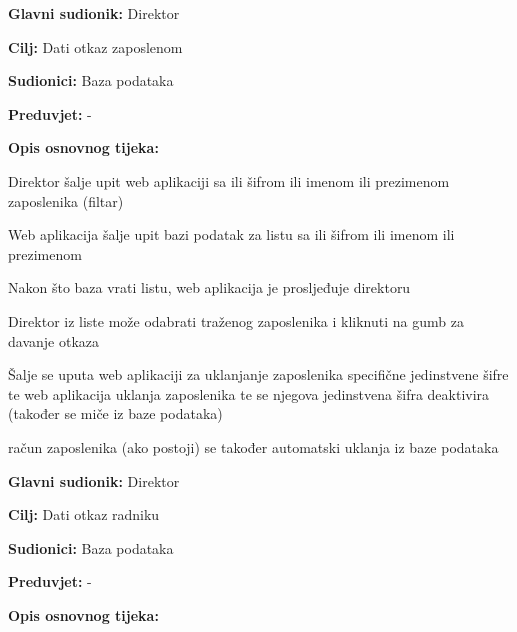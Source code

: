 				\noindent {}
				\begin{packed_item}
					
					\item \textbf{Glavni sudionik:} Direktor
					\item  \textbf{Cilj:} Dati otkaz zaposlenom
					\item  \textbf{Sudionici:} Baza podataka
					\item  \textbf{Preduvjet:} -
					\item  \textbf{Opis osnovnog tijeka:}
					
					\item[] \begin{packed_enum}
						
						\item Direktor šalje upit web aplikaciji sa ili šifrom ili imenom ili prezimenom zaposlenika (filtar)
						\item Web aplikacija šalje upit bazi podatak za listu sa ili šifrom ili imenom ili prezimenom 
						\item Nakon što baza vrati listu, web aplikacija je prosljeđuje direktoru
						\item Direktor iz liste može odabrati traženog zaposlenika i kliknuti na gumb za davanje otkaza
						\item Šalje se uputa web aplikaciji za uklanjanje zaposlenika specifične jedinstvene šifre te web aplikacija uklanja zaposlenika te se njegova jedinstvena šifra deaktivira (također se miče iz baze podataka)
						\item račun zaposlenika (ako postoji) se također automatski uklanja iz baze podataka
								
					\end{packed_enum}
				\pagebreak
				\noindent {}				
				\begin{packed_item}
					
					\item \textbf{Glavni sudionik:} Direktor
					\item  \textbf{Cilj:} Dati otkaz radniku
					\item  \textbf{Sudionici:} Baza podataka
					\item  \textbf{Preduvjet:} -
					\item  \textbf{Opis osnovnog tijeka:}
					
					\item[] \begin{packed_enum}
						

\end{packed_enum}
\end{packed_item}
\end{packed_item}
